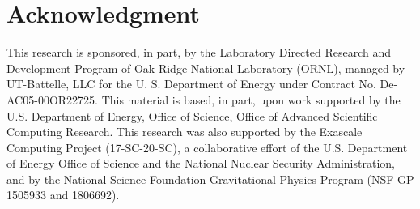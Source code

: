\section{Acknowledgment} \label{se:Acknowledgment}

This research is sponsored, in part, by the Laboratory Directed Research and Development Program of Oak Ridge National Laboratory (ORNL), managed by UT-Battelle, LLC for the U. S. Department of Energy under Contract No. De-AC05-00OR22725. This material is based, in part, upon work supported by the U.S. Department of Energy, Office of Science, Office of Advanced Scientific Computing Research. This research was also supported by the Exascale Computing Project (17-SC-20-SC), a collaborative effort of the U.S. Department of Energy Office of Science and the National Nuclear Security Administration, and by the National Science Foundation Gravitational Physics Program (NSF-GP 1505933 and 1806692).